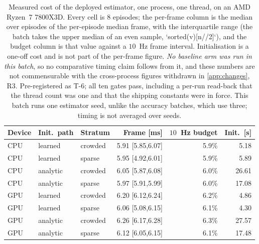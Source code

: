 
\begin{table}[!htbp]
\centering
\footnotesize
\caption{Measured cost of the deployed estimator, one process, one thread, on an AMD Ryzen~7 7800X3D. Every cell is \(8\) episodes; the per-frame column is the median over episodes of the per-episode median frame, with the interquartile range (the batch takes the upper median of an even sample, `sorted(v)[n//2]`), and the budget column is that value against a \(10\)~Hz frame interval. Initialisation is a one-off cost and is not part of the per-frame figure. \emph{No baseline arm was run in this batch}, so no comparative timing claim follows from it, and these numbers are not commensurable with the cross-process figures withdrawn in \ref{app:changes}, R3. Pre-registered as T-6; all ten gates pass, including a per-run read-back that the thread count was one and that the shipping constants were in force. This batch runs one estimator seed, unlike the accuracy batches, which use three; timing is not averaged over seeds.}
\label{tab:budget}
\setlength{\tabcolsep}{5pt}
\begin{tabular}{lllrrr}
\toprule
Device & Init.\ path & Stratum & Frame [ms] & \(10\)~Hz budget & Init.\ [s] \\
\midrule
CPU & learned & crowded & 5.91 {\scriptsize[5.85,6.07]} & 5.9\% & 5.18 \\
CPU & learned & sparse & 5.95 {\scriptsize[4.92,6.01]} & 5.9\% & 5.89 \\
\addlinespace[2pt]
CPU & analytic & crowded & 6.05 {\scriptsize[5.87,6.08]} & 6.0\% & 26.61 \\
CPU & analytic & sparse & 5.97 {\scriptsize[5.91,5.99]} & 6.0\% & 17.08 \\
\addlinespace[2pt]
GPU & learned & crowded & 6.20 {\scriptsize[6.12,6.24]} & 6.2\% & 4.86 \\
GPU & learned & sparse & 6.06 {\scriptsize[5.08,6.15]} & 6.1\% & 4.30 \\
\addlinespace[2pt]
GPU & analytic & crowded & 6.26 {\scriptsize[6.17,6.28]} & 6.3\% & 27.57 \\
GPU & analytic & sparse & 6.12 {\scriptsize[6.05,6.15]} & 6.1\% & 17.48 \\
\bottomrule
\end{tabular}
\end{table}
